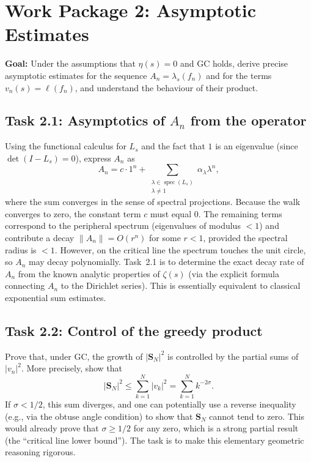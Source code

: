 \documentclass[11pt,a4paper]{article}
\newcommand{\spec}{\operatorname{spec}}
\begin{document}
\section{Work Package 2: Asymptotic Estimates}

\textbf{Goal:}  Under the assumptions that $\eta(s)=0$ and GC holds, derive precise asymptotic estimates for the sequence $A_n = \lambda_s( f_n )$ and for the terms $v_n(s) = \ell( f_n )$, and understand the behaviour of their product.

\subsection{Task 2.1: Asymptotics of $A_n$ from the operator}
Using the functional calculus for $L_s$ and the fact that $1$ is an eigenvalue (since $\det(I-L_s)=0$), express $A_n$ as
\[
A_n = c \cdot 1^n + \sum_{\substack{\lambda \in \spec(L_s)\\ \lambda \neq 1}} \alpha_\lambda \lambda^n,
\]
where the sum converges in the sense of spectral projections.  Because the walk converges to zero, the constant term $c$ must equal $0$.  The remaining terms correspond to the peripheral spectrum (eigenvalues of modulus $<1$) and contribute a decay $\|A_n\| = O( r^n )$ for some $r<1$, provided the spectral radius is $<1$.  However, on the critical line the spectrum touches the unit circle, so $A_n$ may decay polynomially.  Task~2.1 is to determine the exact decay rate of $A_n$ from the known analytic properties of $\zeta(s)$ (via the explicit formula connecting $A_n$ to the Dirichlet series).  This is essentially equivalent to classical exponential sum estimates.

\subsection{Task 2.2: Control of the greedy product}
Prove that, under GC, the growth of $|\mathbf{S}_N|^2$ is controlled by the partial sums of $|v_n|^2$.  More precisely, show that
\[
|\mathbf{S}_N|^2 \le \sum_{k=1}^{N} |v_k|^2 = \sum_{k=1}^{N} k^{-2\sigma}.
\]
If $\sigma < 1/2$, this sum diverges, and one can potentially use a reverse inequality (e.g., via the obtuse angle condition) to show that $\mathbf{S}_N$ cannot tend to zero.  This would already prove that $\sigma \ge 1/2$ for any zero, which is a strong partial result (the ``critical line lower bound'').  The task is to make this elementary geometric reasoning rigorous.
\end{document}
